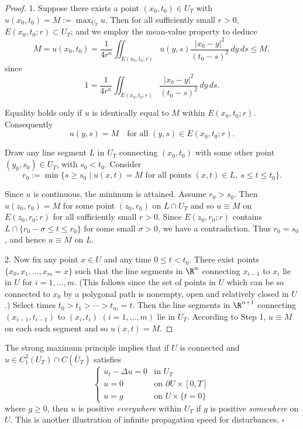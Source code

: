 \begin{proof}
1. Suppose there exists a point $(x_0, t_0) \in U_T$ with $u(x_0, t_0) = M := \max_{U_T} u$. Then for all sufficiently small $r > 0$, $E(x_0, t_0; r) \subset U_T$; and we employ the mean-value property to deduce
$$M = u(x_0,t_0) = \frac{1}{4r^n}\iint_{E(x_0,t_0;r)} u(y,s)\frac{|x_0-y|^2}{(t_0-s)^2}\,dy\,ds \leq M,$$
since
$$1 = \frac{1}{4r^n}\iint_{E(x_0,t_0;r)} \frac{|x_0-y|^2}{(t_0-s)^2}\,dy\,ds.$$

Equality holds only if $u$ is identically equal to $M$ within $E(x_0,t_0;r)$. Consequently
$$u(y,s) = M \quad \text{for all } (y,s) \in E(x_0,t_0;r).$$

Draw any line segment $L$ in $U_T$ connecting $(x_0,t_0)$ with some other point $(y_0,s_0) \in U_T$, with $s_0 < t_0$. Consider
$$r_0 := \min\{s \geq s_0 \mid u(x,t) = M \text{ for all points } (x,t) \in L,\ s \leq t \leq t_0\}.$$

Since $u$ is continuous, the minimum is attained. Assume $r_0 > s_0$. Then $u(z_0,r_0) = M$ for some point $(z_0,r_0)$ on $L \cap U_T$ and so $u \equiv M$ on $E(z_0,r_0;r)$ for all sufficiently small $r>0$. Since $E(z_0,r_0;r)$ contains $L \cap \{r_0-\sigma \leq t \leq r_0\}$ for some small $\sigma>0$, we have a contradiction. Thus $r_0 = s_0$, and hence $u \equiv M$ on $L$.

2. Now fix any point $x \in U$ and any time $0 \leq t < t_0$. There exist points $\{x_0,x_1,\ldots,x_m=x\}$ such that the line segments in $\R^n$ connecting $x_{i-1}$ to $x_i$ lie in $U$ for $i=1,\ldots,m$. (This follows since the set of points in $U$ which can be so connected to $x_0$ by a polygonal path is nonempty, open and relatively closed in $U$.) Select times $t_0 > t_1 > \cdots > t_m = t$. Then the line segments in $\R^{n+1}$ connecting $(x_{i-1},t_{i-1})$ to $(x_i,t_i)$ $(i=1,\ldots,m)$ lie in $U_T$. According to Step 1, $u \equiv M$ on each such segment and so $u(x,t) = M$.
\end{proof}

\begin{remark}
\label{rem:strong-maximum-principle-heat-positivity}
The strong maximum principle implies that if $U$ is connected and $u \in C_1^2(U_T) \cap C(\bar{U}_T)$ satisfies
$$\begin{cases} u_t - \Delta u = 0 & \text{in } U_T \\ u = 0 & \text{on } \partial U \times [0,T] \\ u = g & \text{on } U \times \{t=0\} \end{cases}$$
where $g \geq 0$, then $u$ is positive \textit{everywhere} within $U_T$ if $g$ is positive \textit{somewhere} on $U$. This is another illustration of infinite propagation speed for disturbances. $\square$
\end{remark}

